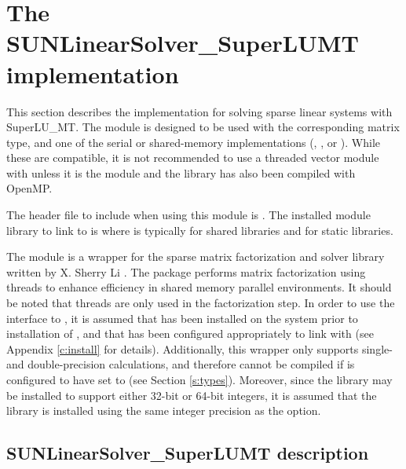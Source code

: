 \section{The SUNLinearSolver\_SuperLUMT implementation}
\label{ss:sunlinsol_superlumt}

This section describes the {\sunlinsol} implementation for solving sparse linear
systems with SuperLU\_MT. The {\superlumt} module is designed to be used with the
corresponding {\sunmatsparse} matrix type, and one of the serial or
shared-memory {\nvector} implementations ({\nvecs}, {\nvecopenmp}, or
{\nvecpthreads}). While these are compatible, it is not recommended
to use a threaded vector module with {\sunlinsolslumt} unless it is
the {\nvecopenmp} module and the {\superlumt} library has also been
compiled with OpenMP.

The header file to include when using this module
is . The installed module
library to link to is
where  is typically  for shared libraries and
 for static libraries.

The {\sunlinsolslumt} module is a {\sunlinsol} wrapper for
the {\superlumt} sparse matrix factorization and solver library
written by X. Sherry Li \cite{SuperLUMT_site,Li:05,DGL:99}.  The
package performs matrix factorization using threads to enhance
efficiency in shared memory parallel environments.  It should be noted
that threads are only used in the factorization step.  In
order to use the {\sunlinsolslumt} interface to {\superlumt}, it is
assumed that {\superlumt} has been installed on the system prior to
installation of {\sundials}, and that {\sundials} has been configured
appropriately to link with {\superlumt} (see Appendix \ref{c:install}
for details).  Additionally, this wrapper only supports single- and
double-precision calculations, and therefore cannot be compiled if
{\sundials} is configured to have  set to 
(see Section \ref{s:types}).  Moreover, since the {\superlumt} library
may be installed to support either 32-bit or 64-bit integers, it is
assumed that the {\superlumt} library is installed using the same
integer precision as the {\sundials}  option. {\warn}

\subsection{SUNLinearSolver\_SuperLUMT description}
\label{ss:sunlinsol_slumt_usage}


